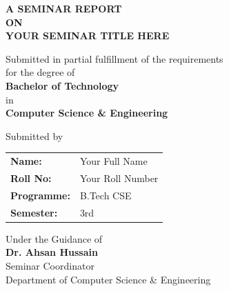 \documentclass[a4paper,12pt]{report}
\begin{document}
\thispagestyle{empty}
\begin{center}

\vspace*{1cm}

{\fontsize{16}{19.2}\selectfont\bfseries A SEMINAR REPORT}\\[0.3cm]
{\fontsize{14}{16.8}\selectfont\bfseries ON}\\[0.5cm]

{\fontsize{18}{21.6}\selectfont\bfseries\MakeUppercase{Your Seminar Title Here}}

\vspace{1.5cm}

{\fontsize{12}{14.4}\selectfont Submitted in partial fulfillment of the requirements}\\[0.1cm]
{\fontsize{12}{14.4}\selectfont for the degree of}\\[0.3cm]

{\fontsize{14}{16.8}\selectfont\bfseries Bachelor of Technology}\\[0.2cm]

{\fontsize{12}{14.4}\selectfont in}\\[0.2cm]

{\fontsize{14}{16.8}\selectfont\bfseries Computer Science \& Engineering}

\vspace{1.5cm}

{\fontsize{12}{14.4}\selectfont Submitted by}\\[0.4cm]

\begin{tabular}{ll}
  \textbf{Name:}       & Your Full Name \\[0.2cm]
  \textbf{Roll No:}    & Your Roll Number \\[0.2cm]
  \textbf{Programme:}  & B.Tech CSE \\[0.2cm]
  \textbf{Semester:}   & 3rd \\[0.2cm]
\end{tabular}

\vspace{0.8cm}

{\fontsize{12}{14.4}\selectfont Under the Guidance of}\\[0.3cm]
{\fontsize{12}{14.4}\selectfont\bfseries Dr. Ahsan Hussain}\\[0.1cm]
{\fontsize{12}{14.4}\selectfont Seminar Coordinator}\\[0.1cm]
{\fontsize{12}{14.4}\selectfont Department of Computer Science \& Engineering}


\end{center}
\end{document}
